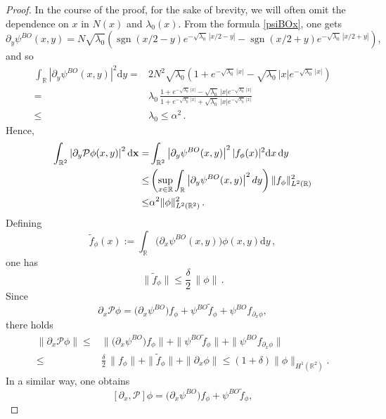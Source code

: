 \documentclass[a4paper,11pt,reqno]{amsart}
\theoremstyle{definition}
\numberwithin{equation}{section}
\DeclareMathOperator{\sgn}{sgn}
\newcommand{\RE}{\mathbb R}
\newcommand{\NN}{N}
\newcommand{\PP}{\mathcal P}
\renewcommand{\d}{\mathrm{d}}
\newcommand{\x}{{\bf  x}}
\begin{document}
\begin{proof}
In the course of the proof, for the sake of brevity, we will often omit the dependence on $x$ in $\NN(x)$ and $\lambda_0(x)$. From the formula \eqref{psiBOx}, one gets
\[
\partial_y \psi^{BO}(x,y) =     {\NN}\sqrt{\lambda_0 } 
\left(\sgn(x/2-y)e^{-\sqrt{\lambda_0 }\,|x/2-y|} - \sgn(x/2+y)e^{-\sqrt{\lambda_0 }\,|x/2+y|}\right) ,
\]
and so
\[\begin{aligned}
\int_\RE \left|\partial_y\psi^{BO}(x,y)\right|^2 \d y  
= & 2 \NN^2 \sqrt{\lambda_0 }\left(1+e^{-\sqrt{\lambda_0 }\,|x|} -\sqrt{\lambda_0 }\,|x| e^{-\sqrt{\lambda_0 }\,|x|} \right) \\ =&  \lambda_0 \,\frac{1+e^{-\sqrt{\lambda_0 }\,|x|} -\sqrt{\lambda_0 }\,|x| e^{-\sqrt{\lambda_0 }\,|x|} }{1+e^{-\sqrt{\lambda_0 }\,|x|} +\sqrt{\lambda_0 }\,|x| e^{-\sqrt{\lambda_0 }\,|x|} } \\
\leq &\lambda_0  \leq\alpha^2\,.
\end{aligned}\]
Hence,
\begin{align*}
\int_{\RE^2}\left|\partial_y\mathcal{P} \phi(x,y)\right|^2 \d\x  = &\int_{\RE^2} \left|\partial_y\psi^{BO}(x,y)\right|^2 |f_\phi(x)|^2 \d x\,\d y  \\
  \leq & \left(\sup_{x \in \RE} \int_\RE \left|\partial_y\psi^{BO}(x,y)
\right|^2 dy \right)\|f_{\phi}\|^2_{L^2(\RE)}\\
\leq &\alpha^{2}\| \phi \|^2_{L^2(\RE^2)}\, .
\end{align*} 
Defining
\begin{equation*}%
    \tilde f_\phi(x) :=  \int_{\RE} \big(\partial_x\psi^{BO}(x,y)\big) \phi(x,y) \d y \,,
    \end{equation*}
one has
     \[
\|  \tilde f_\phi\| \leq \frac{\delta}{2}\,\|\phi\|\,. 
    \]
    Since
    \begin{equation*}%
    \partial_x \PP\phi  = \big(\partial_x\psi^{BO}\big) f_\phi  +\psi^{BO}\tilde f_\phi +  \psi^{BO}f_{\partial_x\phi},
    \end{equation*}
    there holds 
  \[\begin{aligned}
    \|\partial_x \PP \phi\|  \leq & \|\big(\partial_x\psi^{BO}\big) f_\phi\|  +\|\psi^{BO}\tilde f_\phi \| +\|\psi^{BO} f_{\partial_x\phi} \|  \\ 
     \leq &
     \frac\delta2\,\|f_\phi\|  +\|\tilde f_\phi \| + \|\partial_x \phi \| \leq (1+\delta) \|\phi\|_{H^1(\RE^2)} . 
   \end{aligned}
   \]
    In a similar way, one obtains 
 \[
    [\partial_x, \PP]\phi  = \big(\partial_x\psi^{BO}\big) f_\phi  +\psi^{BO}\tilde f_\phi ,
\]
\end{proof}
\end{document}
